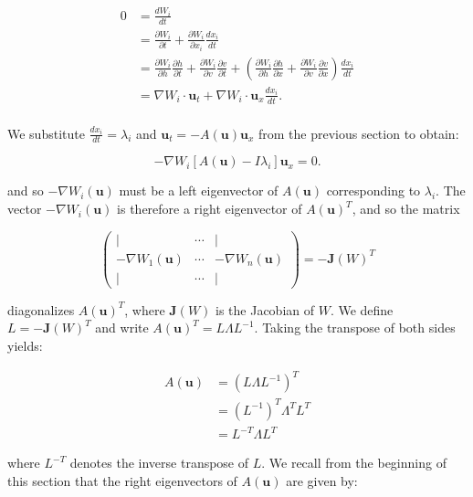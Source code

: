 \begin{align*}
    0 &= \frac{d W_i}{dt} \\
      &= \frac{\partial W_i}{\partial t} + \frac{\partial W_i}{\partial x_i} \frac{dx_i}{dt} \\
      &= \frac{\partial W_i}{\partial h}\frac{\partial h}{\partial t}
       + \frac{\partial W_i}{\partial v}\frac{\partial v}{\partial t}
       + \left(\frac{\partial W_i}{\partial h}\frac{\partial h}{\partial x}
       + \frac{\partial W_i}{\partial v}\frac{\partial v}{\partial x} \right) \frac{dx_i}{dt} \\
      &= \nabla W_i \cdot \textbf{u}_t + \nabla W_i \cdot \textbf{u}_x \frac{dx_i}{dt}. \\
\end{align*}

\noindent We substitute $\frac{d x_i}{dt} = \lambda_i$ and $\textbf{u}_t = -A(\textbf{u}) \textbf{u}_x$ from the 
previous section to obtain:

$$
-\nabla W_i \left[ A(\textbf{u}) - I \lambda_i \right] \textbf{u}_x = 0.
$$

\noindent and so $-\nabla W_i (\textbf{u})$ must be a left eigenvector of $A(\textbf{u})$ corresponding to $\lambda_i$.
The vector $-\nabla W_i (\textbf{u})$ is therefore a right eigenvector of $A(\textbf{u})^T$, and so the matrix

$$
\begin{pmatrix}
    \vert                   & \cdots & \vert \\
    -\nabla W_1(\textbf{u}) & \cdots & -\nabla W_n(\textbf{u})  \\
    \vert                   & \cdots & \vert
\end{pmatrix} = -\textbf{J}(W)^T
$$

\noindent diagonalizes $A(\textbf{u})^T$, where $\textbf{J}(W)$ is the Jacobian of $W$. We define $L = -\textbf{J}(W)^T$
and write $A(\textbf{u})^T = L \Lambda L^{-1}$. Taking the transpose of both sides yields:

\begin{align*}
    A(\textbf{u}) &= \left( L \Lambda L^{-1} \right)^T   \\
                  &= \left(L^{-1}\right)^T \Lambda^T L^T \\
                  &= L^{-T} \Lambda L^T
\end{align*}

\noindent where $L^{-T}$ denotes the inverse transpose of $L$. We recall from the beginning of this section that the 
right eigenvectors of $A(\textbf{u})$ are given by:

